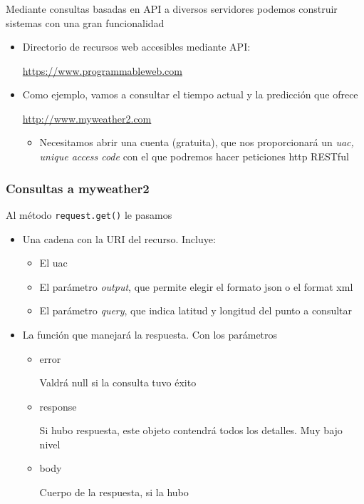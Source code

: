 \documentclass[ucs]{beamer}
\begin{document}
\begin{frame}[fragile]
\frametitle{}
Mediante consultas basadas en API a diversos servidores podemos construir
sistemas con una gran funcionalidad

\begin{itemize}
\item
Directorio de recursos web accesibles mediante API:

\url{https://www.programmableweb.com}

\item
Como ejemplo, vamos a consultar el tiempo actual y la predicción
que ofrece

\url{http://www.myweather2.com}
    \begin{itemize}
    \item

Necesitamos abrir una cuenta (gratuita), que nos proporcionará
un 
\emph{uac, unique access code}
con el que podremos hacer peticiones http RESTful
    \end{itemize}
\end{itemize}
\end{frame}

\begin{frame}[fragile]
\frametitle{Consultas a myweather2}
Al método 
\verb|request.get()| le pasamos
\begin{itemize}
\item
Una cadena con la URI del recurso. Incluye:

    \begin{itemize}
    \item
El uac
    \item
El parámetro 
\emph{output}, que
permite elegir el formato json o el format xml

    \item
El parámetro
\emph{query}, que indica 
latitud y longitud del punto a consultar
    \end{itemize}

\item
La función que manejará la respuesta. Con los parámetros

    \begin{itemize}
    \item
error

Valdrá null si la consulta tuvo éxito

    \item
response

Si hubo respuesta, este objeto contendrá todos los detalles. Muy bajo
nivel
    \item
body

Cuerpo de la respuesta, si la hubo
    \end{itemize}
\end{itemize}
\end{frame}
\end{document}
